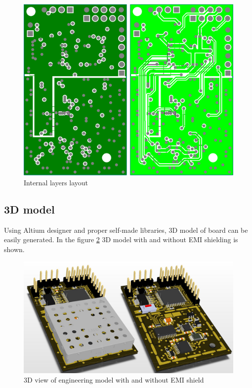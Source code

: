         \begin{figure}[H]
            \centering
            \includegraphics[width=0.5\paperwidth]{img/06/internal_layers_layout.eps}
            \caption{Internal layers layout}
            \label{internal_layers_layout}
        \end{figure}

    \subsection{3D model}
        Using Altium designer and proper self-made libraries, 3D model of board can be easily generated. In the figure \ref{pcb_3d_model} 3D model with and without EMI shielding is shown.

        \begin{figure}[H]
            \centering
            \includegraphics[width=0.8\paperwidth]{img/06/pcb_3d_model.png}
            \caption{3D view of engineering model with and without EMI shield}
            \label{pcb_3d_model}
        \end{figure}

